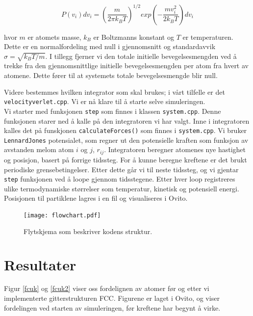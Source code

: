 \documentclass[paper=a4, fontsize=11pt]{scrartcl} %
\numberwithin{equation}{section} %
\numberwithin{figure}{section} %
\numberwithin{table}{section} %
\begin{document}
\begin{equation}
P(v_i)dv_i = \left(\frac{m}{2\pi k_B T} \right)^{1/2} exp \left(- \frac{mv_i^2}{2k_B T} \right)dv_i
\end{equation}

hvor $m$ er atomets masse, $k_B$ er Boltzmanns konstant og $T$ er temperaturen. Dette er en normalfordeling med null i gjennomsnitt og standardavvik $\sigma = \sqrt{k_B T/m}$. I tillegg fjerner vi den totale initielle bevegelsesmengden ved å trekke fra den gjennomsnittlige initielle bevegelsesmengden per atom fra hvert av atomene. Dette fører til at systemets totale bevegelsesmengde blir null.

Videre bestemmes hvilken integrator som skal brukes; i vårt tilfelle er det \texttt{velocityverlet.cpp}. Vi er nå klare til å starte selve simuleringen. \\

Vi starter med funksjonen \texttt{step} som finnes i klassen \texttt{system.cpp}. Denne funksjonen starer ned å kalle på den integratoren vi har valgt. Inne i integratoren kalles det på funskjonen \texttt{calculateForces()} som finnes i \texttt{system.cpp}. Vi bruker \texttt{LennardJones} potensialet, som regner ut den potensielle kraften som funksjon av avstanden melom atom $i$ og $j$, $r_{ij}$. Integratoren beregner atomenes nye hastighet og posisjon, basert på forrige tidssteg. For å kunne beregne kreftene er det brukt periodiske grensebetingelser. Etter dette går vi til neste tidssteg, og vi gjentar \texttt{step} funksjonen ved å loope gjennom tidsstegene. Etter hver loop registreres ulike termodynamiske størrelser som temperatur, kinetisk og potensiell energi. Posisjonen til partiklene lagres i en fil og visualiseres i Ovito. 

\FloatBarrier
\begin{figure}[!ht]
 \centering
 \texttt{[image: flowchart.pdf]}
 \caption{Flytskjema som beskriver kodens struktur.}
 \label{flow}
 \end{figure}
 \FloatBarrier


\section{Resultater}
Figur \ref{fcuk} og \ref{fcuk2} viser oss fordelignen av atomer før og etter vi implementerte gitterstrukturen FCC. Figurene er laget i Ovito, og viser fordelingen ved starten av simuleringen, før kreftene har begynt å virke. 
\end{document}
